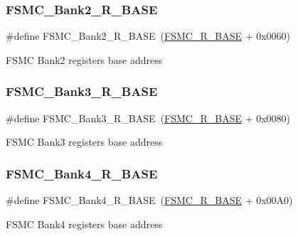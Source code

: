 \subsubsection{\texorpdfstring{FSMC\_Bank2\_R\_BASE}{FSMC\_Bank2\_R\_BASE}}
{\footnotesize\ttfamily \#define F\+S\+M\+C\+\_\+\+Bank2\+\_\+\+R\+\_\+\+B\+A\+SE~(\mbox{\hyperlink{group___peripheral__memory__map_gaddf0e199dccba83272b20c9fb4d3aaed}{F\+S\+M\+C\+\_\+\+R\+\_\+\+B\+A\+SE}} + 0x0060)}

F\+S\+MC Bank2 registers base address \mbox{\label{group___peripheral__memory__map_gacf056152c9e5aefcc67db78d1302c0d7}} 
\subsubsection{\texorpdfstring{FSMC\_Bank3\_R\_BASE}{FSMC\_Bank3\_R\_BASE}}
{\footnotesize\ttfamily \#define F\+S\+M\+C\+\_\+\+Bank3\+\_\+\+R\+\_\+\+B\+A\+SE~(\mbox{\hyperlink{group___peripheral__memory__map_gaddf0e199dccba83272b20c9fb4d3aaed}{F\+S\+M\+C\+\_\+\+R\+\_\+\+B\+A\+SE}} + 0x0080)}

F\+S\+MC Bank3 registers base address \mbox{\label{group___peripheral__memory__map_gaf9e5417133160b0bdd0498d982acec19}} 
\subsubsection{\texorpdfstring{FSMC\_Bank4\_R\_BASE}{FSMC\_Bank4\_R\_BASE}}
{\footnotesize\ttfamily \#define F\+S\+M\+C\+\_\+\+Bank4\+\_\+\+R\+\_\+\+B\+A\+SE~(\mbox{\hyperlink{group___peripheral__memory__map_gaddf0e199dccba83272b20c9fb4d3aaed}{F\+S\+M\+C\+\_\+\+R\+\_\+\+B\+A\+SE}} + 0x00\+A0)}

F\+S\+MC Bank4 registers base address \mbox{\label{group___peripheral__memory__map_gaddf0e199dccba83272b20c9fb4d3aaed}} 
